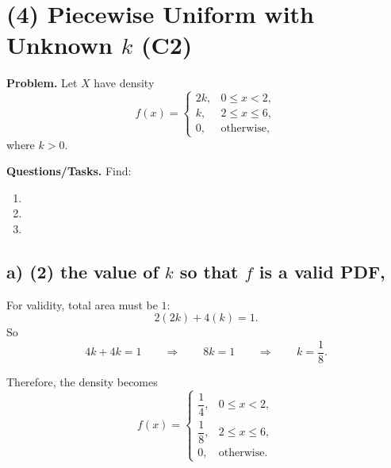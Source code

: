 

\section{(4) Piecewise Uniform with Unknown \texorpdfstring{$k$}{k} (C2)}
\label{sec:piecewise-uniform-with-unknown-k-c2}

\textbf{Problem.}
Let $X$ have density
\[
f(x)=
\begin{cases}
	2k, & 0\le x<2,\\
	k, & 2\le x\le 6,\\
	0, & \text{otherwise,}
\end{cases}
\]
where $k>0$.

\textbf{Questions/Tasks.}
Find:
\begin{enumerate}[label=\textbf{\alph*)}]
	\item {}
	\item {}
	\item {}
\end{enumerate}


\subsection*{a) \textbf{(2)} the value of $k$ so that $f$ is a valid PDF,}
\label{subsec:piecewise-uniform-with-unknown-k-c2-a}
For validity, total area must be $1$:
\[
2(2k)+4(k)=1.
\]
So
\[
4k+4k=1
\qquad \Rightarrow \qquad
8k=1
\qquad \Rightarrow \qquad
k=\frac{1}{8}.
\]

Therefore, the density becomes
\[
f(x)=
\begin{cases}
	\dfrac{1}{4}, & 0\le x<2,\\[6pt]
	\dfrac{1}{8}, & 2\le x\le 6,\\[6pt]
	0, & \text{otherwise.}
\end{cases}
\]


